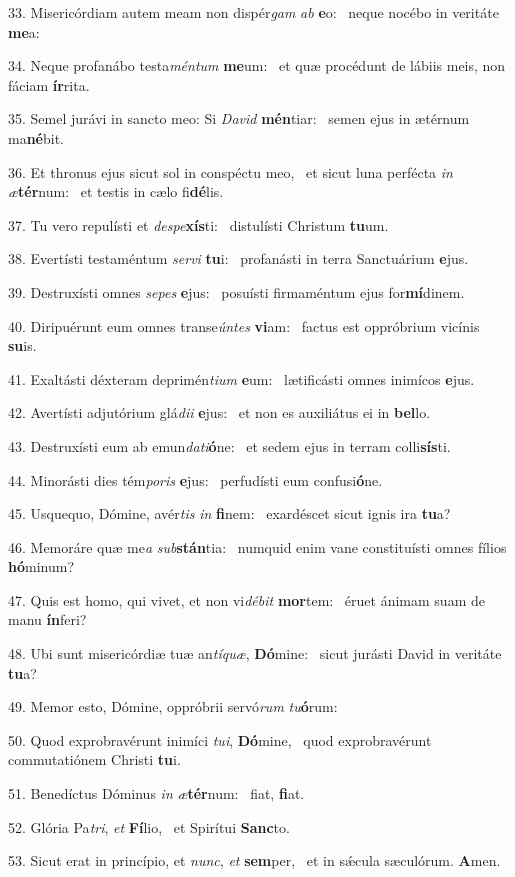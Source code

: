 33. Misericórdiam autem meam non dispér\textit{gam} \textit{ab} \textbf{e}o: \ast\  neque nocébo in veritáte \textbf{me}a:\

34. Neque profanábo testa\textit{mén}\textit{tum} \textbf{me}um: \ast\  et quæ procédunt de lábiis meis, non fáciam \textbf{ír}rita.\

35. Semel jurávi in sancto meo: Si \textit{Da}\textit{vid} \textbf{mén}tiar: \ast\  semen ejus in ætérnum ma\textbf{né}bit.\

36. Et thronus ejus sicut sol in conspéctu meo, \dag\  et sicut luna perfécta \textit{in} \textit{æ}\textbf{tér}num: \ast\  et testis in cælo fi\textbf{dé}lis.\

37. Tu vero repulísti et \textit{de}\textit{spe}\textbf{xís}ti: \ast\  distulísti Christum \textbf{tu}um.\

38. Evertísti testaméntum \textit{ser}\textit{vi} \textbf{tu}i: \ast\  profanásti in terra Sanctuárium \textbf{e}jus.\

39. Destruxísti omnes \textit{se}\textit{pes} \textbf{e}jus: \ast\  posuísti firmaméntum ejus for\textbf{mí}dinem.\

40. Diripuérunt eum omnes transe\textit{ún}\textit{tes} \textbf{vi}am: \ast\  factus est oppróbrium vicínis \textbf{su}is.\

41. Exaltásti déxteram deprimén\textit{ti}\textit{um} \textbf{e}um: \ast\  lætificásti omnes inimícos \textbf{e}jus.\

42. Avertísti adjutórium glá\textit{di}\textit{i} \textbf{e}jus: \ast\  et non es auxiliátus ei in \textbf{bel}lo.\

43. Destruxísti eum ab emun\textit{da}\textit{ti}\textbf{ó}ne: \ast\  et sedem ejus in terram colli\textbf{sís}ti.\

44. Minorásti dies tém\textit{po}\textit{ris} \textbf{e}jus: \ast\  perfudísti eum confusi\textbf{ó}ne.\

45. Usquequo, Dómine, avér\textit{tis} \textit{in} \textbf{fi}nem: \ast\  exardéscet sicut ignis ira \textbf{tu}a?\

46. Memoráre quæ me\textit{a} \textit{sub}\textbf{stán}tia: \ast\  numquid enim vane constituísti omnes fílios \textbf{hó}minum?\

47. Quis est homo, qui vivet, et non vi\textit{dé}\textit{bit} \textbf{mor}tem: \ast\  éruet ánimam suam de manu \textbf{ín}feri?\

48. Ubi sunt misericórdiæ tuæ an\textit{tí}\textit{quæ}, \textbf{Dó}mine: \ast\  sicut jurásti David in veritáte \textbf{tu}a?\

49. Memor esto, Dómine, oppróbrii servó\textit{rum} \textit{tu}\textbf{ó}rum: \ast\  \

50. Quod exprobravérunt inimíci \textit{tu}\textit{i}, \textbf{Dó}mine, \ast\  quod exprobravérunt commutatiónem Christi \textbf{tu}i.\

51. Benedíctus Dóminus \textit{in} \textit{æ}\textbf{tér}num: \ast\  fiat, \textbf{fi}at.\

52. Glória Pa\textit{tri}, \textit{et} \textbf{Fí}lio, \ast\  et Spirítui \textbf{Sanc}to.\

53. Sicut erat in princípio, et \textit{nunc}, \textit{et} \textbf{sem}per, \ast\  et in sǽcula sæculórum. \textbf{A}men.\

